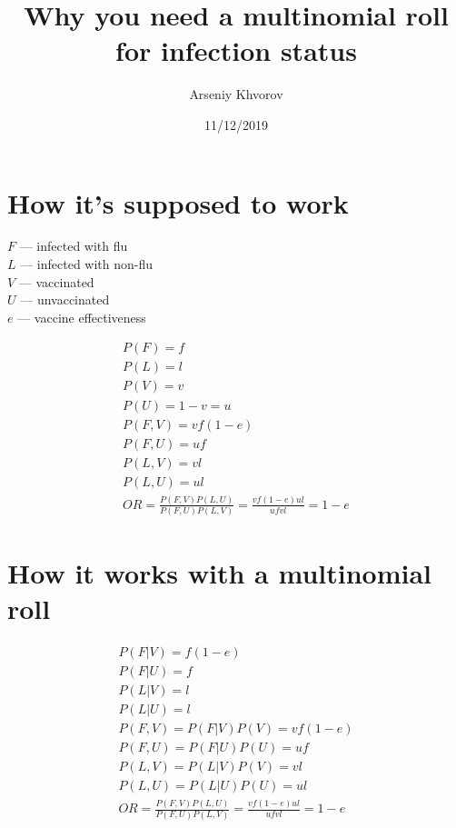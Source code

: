 \documentclass[
]{article}
\title{Why you need a multinomial roll for infection status}
\author{Arseniy Khvorov}
\date{11/12/2019}
\begin{document}
\maketitle

\hypertarget{how-its-supposed-to-work}{%
\section{How it's supposed to work}\label{how-its-supposed-to-work}}

\(F\) --- infected with flu\\
\(L\) --- infected with non-flu\\
\(V\) --- vaccinated\\
\(U\) --- unvaccinated\\
\(e\) --- vaccine effectiveness

\[
\begin{gathered}
P(F) = f \\
P(L) = l \\
P(V) = v \\
P(U) = 1 - v = u \\
P(F,V) = vf(1-e) \\
P(F,U) = uf \\
P(L,V) = vl \\
P(L,U) = ul \\
OR = \frac{P(F,V)P(L,U)}{P(F,U)P(L,V)}=\frac{vf(1-e)ul}{ufvl}=1-e
\end{gathered}
\]

\hypertarget{how-it-works-with-a-multinomial-roll}{%
\section{How it works with a multinomial roll}\label{how-it-works-with-a-multinomial-roll}}

\[
\begin{gathered}
P(F|V) = f(1-e) \\
P(F|U) = f \\
P(L|V) = l \\
P(L|U) = l \\
P(F,V) = P(F|V)P(V) = vf(1-e) \\
P(F,U) = P(F|U)P(U) = uf \\
P(L,V) = P(L|V)P(V) = vl \\
P(L,U) = P(L|U)P(U) = ul \\
OR = \frac{P(F,V)P(L,U)}{P(F,U)P(L,V)}=\frac{vf(1-e)ul}{ufvl}=1-e
\end{gathered}
\]
\end{document}
